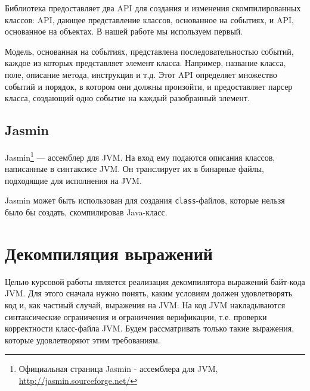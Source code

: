 Библиотека предоставляет два API для создания и изменения скомпилированных классов: API, дающее представление классов, основанное на событиях, и API, основанное на объектах. В нашей работе мы используем первый.

Модель, основанная на событиях, представлена последовательностью событий, каждое из которых представляет  элемент класса. Например, название класса, поле, описание метода, инструкция и т.д. Этот API определяет множество событий и порядок, в котором они должны произойти, и предоставляет парсер класса, создающий одно событие на каждый разобранный элемент.



\subsection{Jasmin}
Jasmin\footnote{Официальная страница Jasmin - ассемблера для JVM,
\url{http://jasmin.sourceforge.net/}} --- ассемблер для JVM. На вход ему подаются описания классов, написанные в синтаксисе JVM. Он транслирует их в бинарные файлы, подходящие для исполнения на JVM. 

Jasmin может быть использован для создания \texttt{class}-файлов, которые нельзя было бы создать, скомпилировав Java-класс.

\section{Декомпиляция выражений}
Целью курсовой работы является реализация декомпилятора выражений байт-кода JVM. Для этого сначала нужно понять, каким условиям должен удовлетворять код и, как частный случай, выражения на JVM. На код JVM накладываются синтаксические ограничения и ограничения верификации, т.е. проверки корректности класс-файла JVM. Будем рассматривать только такие выражения, которые удовлетворяют этим требованиям.

